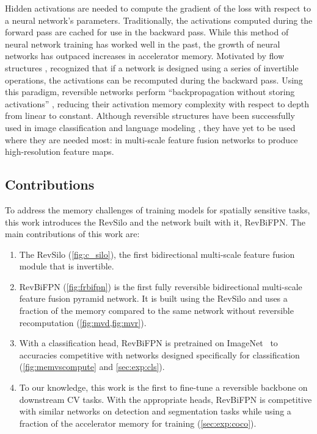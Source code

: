 \documentclass{article}
\begin{document}
Hidden activations are needed to compute the gradient of the loss with respect to a neural network's parameters.
Traditionally, the activations computed during the forward pass are cached for use in the backward pass.
While this method of neural network training has worked well in the past, the growth of neural networks has outpaced increases in accelerator memory.
Motivated by flow structures \cite{dinh2016density,kingma2018glow}, \citet{gomez2017reversible} recognized that if a network is designed using a series of invertible operations, the activations can be recomputed during the backward pass.
Using this paradigm, reversible networks perform ``backpropagation without storing activations'' \cite{gomez2017reversible}, reducing their activation memory complexity with respect to depth from linear to constant.
Although reversible structures have been successfully used in image classification \cite{gomez2017reversible,jacobsen2018irevnet} and language modeling \cite{kitaev2020reformer,mackay2018reversible}, they have yet to be used where they are needed most:
in multi-scale feature fusion networks to produce high-resolution feature maps.

\subsection{Contributions}
\label{sec:intro:contrib}
To address the memory challenges of training models for spatially sensitive tasks, this work introduces the RevSilo and the network built with it, RevBiFPN.
The main contributions of this work are:

\begin{enumerate}[noitemsep, leftmargin=15pt]
    \item The RevSilo (\cref{fig:c_silo}), the first bidirectional multi-scale feature fusion module that is invertible.
    \item RevBiFPN (\cref{fig:frbifpn}) is the first fully reversible bidirectional multi-scale feature fusion pyramid network. It is built using the RevSilo and uses a fraction of the memory compared to the same network without reversible recomputation (\cref{fig:mvd,fig:mvr}).
    \item With a classification head, RevBiFPN is pretrained on ImageNet~\cite{deng2009imagenet} to accuracies competitive with networks designed specifically for classification (\cref{fig:memvscompute} and \cref{sec:exp:cls}).
    \item To our knowledge, this work is the first to fine-tune a reversible backbone on downstream CV tasks. With the appropriate heads, RevBiFPN is competitive with similar networks on detection and segmentation tasks while using a fraction of the accelerator memory for training (\cref{sec:exp:coco}).
\end{enumerate}
\end{document}
